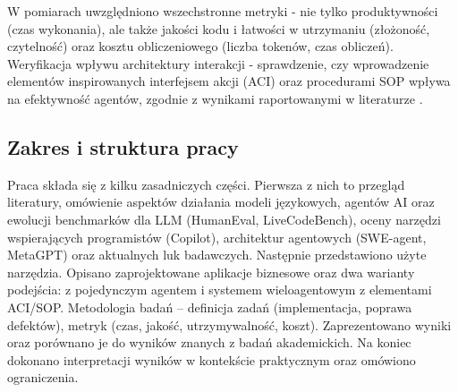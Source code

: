 W pomiarach uwzględniono wszechstronne metryki - nie tylko produktywności (czas wykonania), ale także jakości kodu i łatwości w utrzymaniu (złożoność, czytelność) oraz kosztu obliczeniowego (liczba tokenów, czas obliczeń). Weryfikacja wpływu architektury interakcji - sprawdzenie, czy wprowadzenie elementów inspirowanych interfejsem akcji (ACI) oraz procedurami SOP wpływa na efektywność agentów, zgodnie z wynikami raportowanymi w literaturze \cite{yang2024sweagent}.

\subsection{Zakres i struktura pracy}
Praca składa się z kilku zasadniczych części. Pierwsza z nich to przegląd literatury, omówienie aspektów działania modeli językowych, agentów AI oraz ewolucji benchmarków dla LLM (HumanEval, LiveCodeBench), oceny narzędzi wspierających programistów (Copilot), architektur agentowych (SWE-agent, MetaGPT) oraz aktualnych luk badawczych. Następnie przedstawiono użyte narzędzia. Opisano zaprojektowane aplikacje biznesowe oraz dwa warianty podejścia: z pojedynczym agentem i systemem wieloagentowym z elementami ACI/SOP. Metodologia badań – definicja zadań (implementacja, poprawa defektów), metryk (czas, jakość, utrzymywalność, koszt). Zaprezentowano wyniki oraz porównano je do wyników znanych z badań akademickich. Na koniec dokonano interpretacji wyników w kontekście praktycznym oraz omówiono ograniczenia.